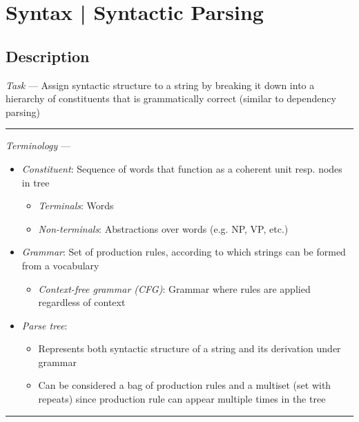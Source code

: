 \section{Syntax | Syntactic Parsing}
\subsection*{Description}
\emph{Task} --- Assign syntactic structure to a string by breaking it down into a hierarchy of constituents that is grammatically correct (similar to dependency parsing)

{\color{lightgray}\hrule height 0.001mm}

\emph{Terminology} ---
\begin{itemize}
    \item \emph{Constituent}: Sequence of words that function as a coherent unit resp. nodes in tree
    \begin{itemize}
        \item \emph{Terminals}: Words 
        \item \emph{Non-terminals}: Abstractions over words (e.g. NP, VP, etc.)
    \end{itemize}
    \item \emph{Grammar}: Set of production rules, according to which strings can be formed from a vocabulary
    \begin{itemize}
        \item \emph{Context-free grammar (CFG)}: Grammar where rules are applied regardless of context
    \end{itemize}
    \item \emph{Parse tree}: 
    \begin{itemize}
        \item Represents both syntactic structure of a string and its derivation under grammar
        \item Can be considered a bag of production rules and a multiset (set with repeats) since production rule can appear multiple times in the tree
    \end{itemize}
\end{itemize}

{\color{black}\hrule height 0.001mm}

